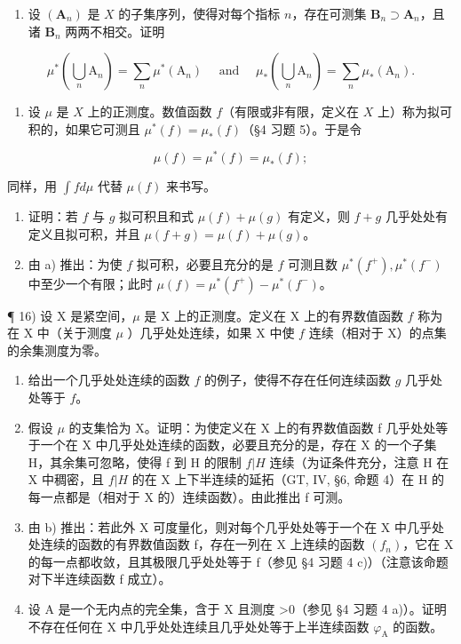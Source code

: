 \begin{enumerate}
\def\labelenumi{\arabic{enumi})}
\setcounter{enumi}{13}
\tightlist
\item
  设 \((\mathbf{A}_n)\) 是 \(X\) 的子集序列，使得对每个指标 \(n\)，存在可测集 \(\mathbf{B}_n \supset \mathbf{A}_n\)，且诸 \(\mathbf{B}_n\) 两两不相交。证明
\end{enumerate}

\[
\mu^ {*} \left(\bigcup_ {n} \mathrm{A} _ {n}\right) = \sum_ {n} \mu^ {*} (\mathrm{A} _ {n}) \quad \text { and } \quad \mu_ {*} \left(\bigcup_ {n} \mathrm{A} _ {n}\right) = \sum_ {n} \mu_ {*} (\mathrm{A} _ {n}).
\]

\begin{enumerate}
\def\labelenumi{\arabic{enumi})}
\setcounter{enumi}{14}
\tightlist
\item
  设 \(\mu\) 是 \(X\) 上的正测度。数值函数 \(f\)（有限或非有限，定义在 \(X\) 上）称为拟可积的，如果它可测且 \(\mu^{*}(f) = \mu_{*}(f)\)（§4 习题 5）。于是令
\end{enumerate}

\[
\mu (f) = \mu^ {*} (f) = \mu_ {*} (f);
\]

同样，用 \(\int f d\mu\) 代替 \(\mu(f)\) 来书写。

\begin{enumerate}
\def\labelenumi{\alph{enumi})}
\item
  证明：若 \(f\) 与 \(g\) 拟可积且和式 \(\mu(f) + \mu(g)\) 有定义，则 \(f + g\) 几乎处处有定义且拟可积，并且 \(\mu(f + g) = \mu(f) + \mu(g)\)。
\item
  由 a) 推出：为使 \(f\) 拟可积，必要且充分的是 \(f\) 可测且数 \(\mu^{*}(f^{+}), \mu^{*}(f^{-})\) 中至少一个有限；此时 \(\mu(f) = \mu^{*}(f^{+}) - \mu^{*}(f^{-})\)。
\end{enumerate}

¶ 16) 设 X 是紧空间，\(\mu\) 是 X 上的正测度。定义在 X 上的有界数值函数 \(f\) 称为在 X 中（关于测度 \(\mu\) ）几乎处处连续，如果 X 中使 \(f\) 连续（相对于 X）的点集的余集测度为零。

\begin{enumerate}
\def\labelenumi{\alph{enumi})}
\item
  给出一个几乎处处连续的函数 \(f\) 的例子，使得不存在任何连续函数 \(g\) 几乎处处等于 \(f\)。
\item
  假设 \(\mu\) 的支集恰为 X。证明：为使定义在 X 上的有界数值函数 f 几乎处处等于一个在 X 中几乎处处连续的函数，必要且充分的是，存在 X 的一个子集 H，其余集可忽略，使得 f 到 H 的限制 \(f|H\) 连续（为证条件充分，注意 H 在 X 中稠密，且 \(f|H\) 的在 X 上下半连续的延拓（GT, IV, §6, 命题 4）在 H 的每一点都是（相对于 X 的）连续函数）。由此推出 f 可测。
\item
  由 b) 推出：若此外 X 可度量化，则对每个几乎处处等于一个在 X 中几乎处处连续的函数的有界数值函数 f，存在一列在 X 上连续的函数 \((f_{n})\)，它在 X 的每一点都收敛，且其极限几乎处处等于 f（参见 §4 习题 4 c)）（注意该命题对下半连续函数 f 成立）。
\item
  设 A 是一个无内点的完全集，含于 X 且测度 \textgreater0（参见 §4 习题 4 a)）。证明不存在任何在 X 中几乎处处连续且几乎处处等于上半连续函数 \(\varphi_{\mathrm{A}}\) 的函数。
\end{enumerate}

